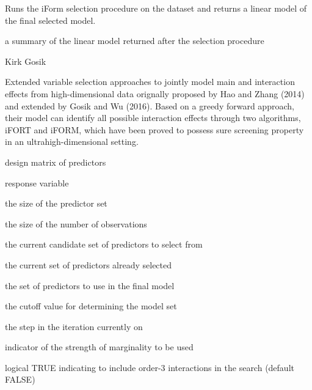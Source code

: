 \documentclass[letterpaper]{book}
\begin{document}
%
\begin{Details}\relax
Runs the iForm selection procedure on the dataset and returns a linear model
of the final selected model.
\end{Details}
%
\begin{Value}
a summary of the linear model returned after the selection procedure
\end{Value}
%
\begin{Author}\relax
Kirk Gosik
\end{Author}
%
\begin{Description}\relax
Extended variable selection approaches to jointly model main and interaction effects from high-dimensional data orignally proposed by Hao and Zhang (2014) and extended by Gosik and Wu (2016).
Based on a greedy forward approach, their model can identify all possible interaction effects through two algorithms, iFORT and iFORM, which have been proved to possess sure screening property in an ultrahigh-dimensional setting.
\end{Description}
%
\begin{Arguments}
\begin{ldescription}
\item[\code{x}] design matrix of predictors

\item[\code{y}] response variable

\item[\code{p}] the size of the predictor set

\item[\code{n}] the size of the number of observations

\item[\code{candidate}] the current candidate set of predictors to select from

\item[\code{solution}] the current set of predictors already selected

\item[\code{model}] the set of predictors to use in the final model

\item[\code{bic}] the cutoff value for determining the model set

\item[\code{step}] the step in the iteration currently on

\item[\code{strong}] indicator of the strength of marginality to be used

\item[\code{higher\_order}] logical TRUE indicating to include order-3 interactions in the search (default FALSE)
\end{ldescription}
\end{Arguments}
\end{document}
